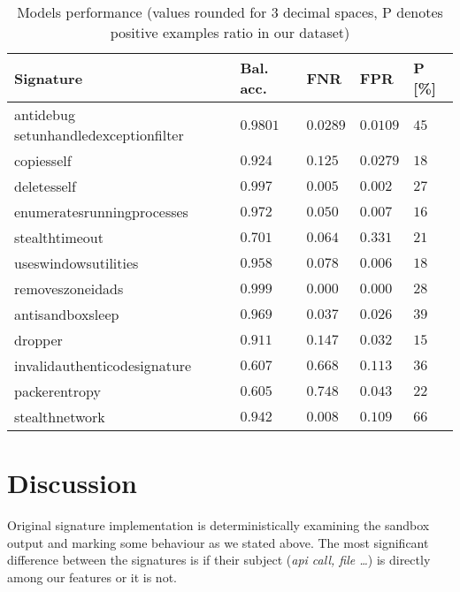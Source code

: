 \begin{table}[h]
  \centering
  \caption{Models performance (values rounded for 3 decimal spaces, P denotes positive examples ratio in our dataset)}
  \begin{tabular}{lllll}
      \toprule
      \textbf{Signature} &
      \textbf{Bal. acc.} &
      \textbf{FNR} &
      \textbf{FPR} &
      \textbf{P [\%]}
      \\
      \midrule
      antidebug setunhandledexceptionfilter & $0.9801$ & $0.0289$ & $0.0109$ & $45$ \\
      \midrule
      copiesself & $0.924$ & $0.125$ & $0.0279$ & $18$ \\
      \midrule
      deletesself & $0.997$ & $0.005$ & $0.002$ & $27$ \\
      \midrule
      enumeratesrunningprocesses & $0.972$ & $0.050$ & $0.007$ & $16$ \\
      \midrule
      stealthtimeout & $0.701$ & $0.064$ & $0.331$ & $21$ \\
      \midrule
      useswindowsutilities & $0.958$ & $0.078$ & $0.006$ & $18$ \\
      \midrule
      removeszoneidads & $0.999$ & $0.000$ & $0.000$ & $28$ \\
      \midrule[0.3pt]
      \midrule[0.3pt]
      antisandboxsleep & $0.969$ & $0.037$ & $0.026$ & $39$ \\
      \midrule
      dropper & $0.911$ & $0.147$ & $0.032$ & $15$ \\
      \midrule
      invalidauthenticodesignature & $0.607$ & $0.668$ & $0.113$ & $36$ \\
      \midrule
      packerentropy & $0.605$ & $0.748$ & $0.043$ & $22$ \\
      \midrule
      stealthnetwork & $0.942$ & $0.008$ & $0.109$ & $66$ \\
      \bottomrule
  \end{tabular}
  \label{tab:models_res}
\end{table}

\section{Discussion}
Original signature implementation is deterministically examining the sandbox output and marking some behaviour as we stated above. The most significant difference between the signatures is if their subject (\emph{api call, file \dots}) is directly among our features or it is not. 

